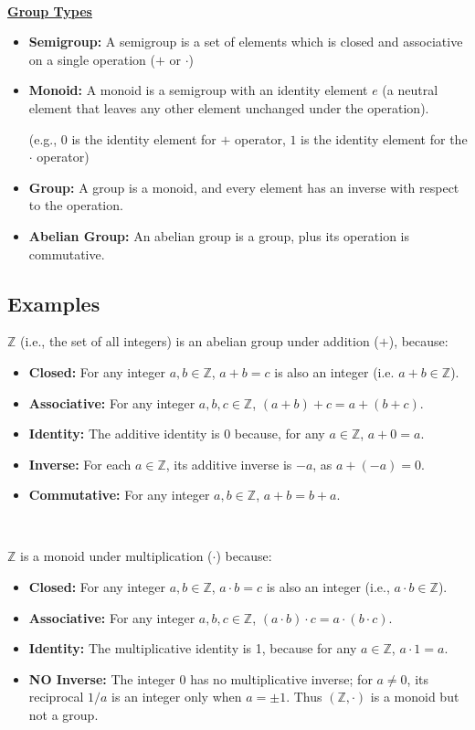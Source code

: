 \begin{tcolorbox}[title={\textbf{\tboxdef{\ref*{subsec:group-def}} Group}}]
$ $

\noindent \textbf{\underline{Group Types}}
\begin{itemize}
\item \textbf{Semigroup:} A semigroup is a set of elements which is closed and associative on a single operation ($+$ or $\cdot$)
\item \textbf{Monoid:} A monoid is a semigroup with an identity element $e$ (a neutral element that leaves any other element unchanged under the operation).

(e.g., $0$ is the identity element for $+$ operator, $1$ is the identity element for the $\cdot$ operator)
\item \textbf{Group:} A group is a monoid, and every element has an inverse with respect to the operation.
\item \textbf{Abelian Group:} An abelian group is a group, plus its operation is commutative.
\end{itemize}
\end{tcolorbox}

\subsection{Examples}
\label{subsec:group-ex}

$\mathbb{Z}$ (i.e., the set of all integers) is an abelian group under addition ($+$), because:
\begin{itemize}
\item \textbf{Closed:} For any integer $a, b \in \mathbb{Z}$, $a + b = c$ is also an integer (i.e. $a+b \in \mathbb{Z}$).
\item \textbf{Associative:} For any integer $a, b, c \in \mathbb{Z}$, $(a + b) + c = a + (b + c)$.
\item \textbf{Identity:} The additive identity is 0 because, for any $a \in \mathbb{Z}$, $a + 0 = a$.
\item \textbf{Inverse:} For each $a \in \mathbb{Z}$, its additive inverse is $-a$, as $a + (-a) = 0$.
\item \textbf{Commutative: } For any integer $a, b \in \mathbb{Z}$, $a + b = b + a$.
\end{itemize}

$ $

\noindent $\mathbb{Z}$ is a monoid under multiplication ($\cdot$) because:
\begin{itemize}
\item \textbf{Closed:} For any integer $a, b \in \mathbb{Z}$, $a \cdot b = c$ is also an integer (i.e., $a\cdot b \in \mathbb{Z}$).
\item \textbf{Associative:} For any integer $a, b, c \in \mathbb{Z}$, $(a \cdot b) \cdot c = a \cdot (b \cdot c)$.
\item \textbf{Identity:} The multiplicative identity is 1, because for any $a \in \mathbb{Z}$, $a \cdot 1 = a$.
\item \textbf{NO Inverse:} The integer $0$ has no multiplicative inverse; for $a\ne0$, its reciprocal $1/a$ is an integer only when $a=\pm1$. Thus $(\mathbb{Z},\cdot)$ is a monoid but not a group.
\end{itemize}
$ $

